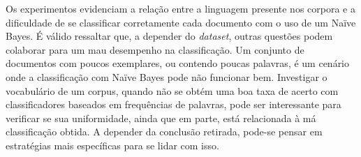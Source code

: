 Os experimentos evidenciam a relação entre a linguagem presente nos corpora e a dificuldade de se classificar corretamente cada documento com o uso de um Naïve Bayes. É válido ressaltar que, a depender do \emph{dataset}, outras questões podem colaborar para um mau desempenho na classificação. Um conjunto de documentos com poucos exemplares, ou contendo poucas palavras, é um cenário onde a classificação com Naïve Bayes pode não funcionar bem. Investigar o vocabulário de um corpus, quando não se obtém uma boa taxa de acerto com classificadores baseados em frequências de palavras, pode ser interessante para verificar se sua uniformidade, ainda que em parte, está relacionada à má classificação obtida. A depender da conclusão retirada, pode-se pensar em estratégias mais específicas para se lidar com isso. 
 











